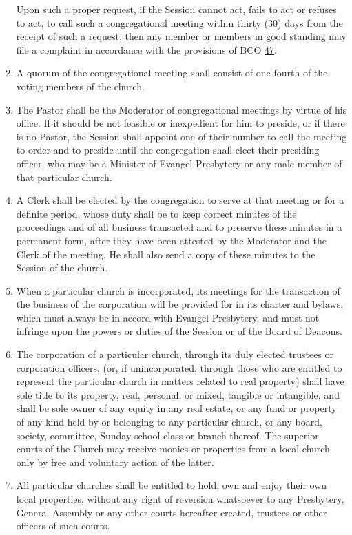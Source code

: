 \documentclass[
]{book}
\begin{document}
\begin{enumerate}
  Upon such a proper request, if the Session cannot act, fails to act or refuses to act, to call such a congregational meeting within thirty (30) days from the receipt of such a request, then any member or members in good standing may file a complaint in accordance with the provisions of BCO \protect\hyperlink{47}{47}.
\item
  A quorum of the congregational meeting shall consist of one-fourth of the voting members of the church.
\item
  The Pastor shall be the Moderator of congregational meetings by virtue of his office. If it should be not feasible or inexpedient for him to preside, or if there is no Pastor, the Session shall appoint one of their number to call the meeting to order and to preside until the congregation shall elect their presiding officer, who may be a Minister of Evangel Presbytery or any male member of that particular church.
\item
  A Clerk shall be elected by the congregation to serve at that meeting or for a definite period, whose duty shall be to keep correct minutes of the proceedings and of all business transacted and to preserve these minutes in a permanent form, after they have been attested by the Moderator and the Clerk of the meeting. He shall also send a copy of these minutes to the Session of the church.
\item
  When a particular church is incorporated, its meetings for the transaction of the business of the corporation will be provided for in its charter and bylaws, which must always be in accord with Evangel Presbytery, and must not infringe upon the powers or duties of the Session or of the Board of Deacons.
\item
  The corporation of a particular church, through its duly elected trustees or corporation officers, (or, if unincorporated, through those who are entitled to represent the particular church in matters related to real property) shall have sole title to its property, real, personal, or mixed, tangible or intangible, and shall be sole owner of any equity in any real estate, or any fund or property of any kind held by or belonging to any particular church, or any board, society, committee, Sunday school class or branch thereof. The superior courts of the Church may receive monies or properties from a local church only by free and voluntary action of the latter.
\item
  All particular churches shall be entitled to hold, own and enjoy their own local properties, without any right of reversion whatsoever to any Presbytery, General Assembly or any other courts hereafter created, trustees or other officers of such courts.

\end{enumerate}
\end{document}
